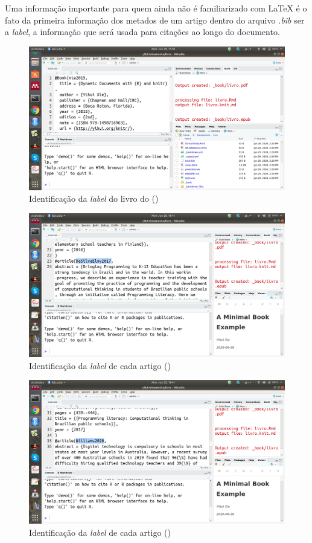 \documentclass[
]{book}
\begin{document}
Uma informação importante para quem ainda não
é familiarizado com LaTeX é o fato
da primeira informação dos metados
de um artigo dentro do arquivo \emph{.bib}
ser a \emph{label}, a informação que será
usada para citações ao longo do documento.

\begin{figure}
\centering
\includegraphics{fig/rstudio_open_bookbib_first.png}
\caption{Identificação da \emph{label} do livro do (\citep{xie2015})}
\end{figure}

\begin{figure}
\centering
\includegraphics{fig/rstudio_open_bookbib_second.png}
\caption{Identificação da \emph{label} de cada artigo (\citep{DaSilvaEloy2017})}
\end{figure}

\begin{figure}
\centering
\includegraphics{fig/rstudio_open_bookbib_third.png}
\caption{Identificação da \emph{label} de cada artigo (\citep{Williams2020})}
\end{figure}
\end{document}
